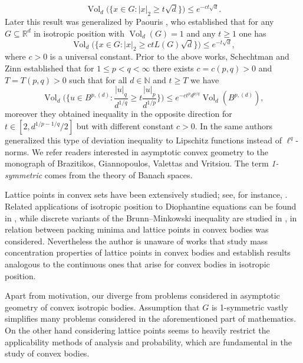\documentclass[a4paper,oneside, reqno]{amsart}
\numberwithin{equation}{section}
\theoremstyle{definition}%
\theoremstyle{definition}
\theoremstyle{definition}%
\theoremstyle{definition}
\newcommand{\R}{\mathbb{R}}
\newcommand{\N}{\mathbb{N}}
\DeclareMathOperator{\Vol}{Vol}
\begin{document}
\begin{equation} \label{eq:conc of mes bob-naz}
    \Vol_d\Big( \Big\{ x \in G: |x|_2 \ge t \sqrt{d} \Big\} \Big) \le e^{-ct\sqrt{d}}.
\end{equation}
Later this result was generalized by Paouris \cite{Pa}, who established that for any $G \subseteq \R^d$ in isotropic position with $\Vol_d(G)=1$ and any $t \ge 1$ one has
\[
\Vol_d\Big( \Big\{x \in G: |x|_2 \ge ct L(G) \sqrt{d} \Big\}\Big) \le e^{-t\sqrt{d}},
\]
where $c>0$ is a universal constant.
Prior to the above works, Schechtman and Zinn \cite{SZ} established that for $1 \le p<q< \infty$ there exists $c=c(p,q)>0$ and $T=T(p,q)>0$ such that for all $d\in \N$ and $t \ge T$ we have 
\[
 \Vol_d\Big(\Big\{ u \in B^{p,(d)}: \frac{|u|_q}{d^{1/q}} \ge t \frac{|u|_p}{d^{1/p}}\Big\} \Big) \le  e^{-ct^pd^{p/q}}\Vol_d(B^{p,(d)}),
\]
moreover they obtained inequality in the opposite direction for $t \in [2, d^{1/p-1/q}/2]$ but with different constant $c>0$. In \cite{SZ2} the same authors generalized this type of deviation inequality to Lipschitz functions instead of $\ell^q$-norms.
We refer readers interested in asymptotic convex geometry to the monograph \cite{conv book} of Brazitikos, Giannopoulos, Valettas and Vritsiou. The term \textit{1-symmetric} comes from the theory of Banach spaces.
\par Lattice points in convex sets have been extensively studied; see, for instance, \cite{matusek}. Related applications of isotropic position to Diophantine equations can be found in \cite{He}, while discrete variants of the Brunn--Minkowski inequality are studied in \cite{INZ,HKS}, in \cite{HSX} relation between packing minima and lattice points in convex bodies was considered.
Nevertheless the author is unaware of works that study mass concentration properties of lattice points in convex bodies and establish results analogous to the continuous ones that arise for convex bodies in isotropic position.
\par 
Apart from motivation, our diverge from problems considered in asymptotic geometry of convex isotropic bodies. Assumption that $G$ is 1-symmetric vastly simplifies many problems considered in the aforementioned part of mathematics. On the other hand considering lattice points seems to heavily restrict the applicability methods of analysis and probability, which are fundamental in the study of convex bodies.
\end{document}
